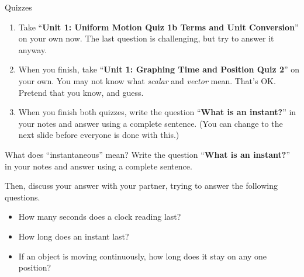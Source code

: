 \documentclass[t]{beamer}
\begin{document}
\begin{frame}{Quizzes}\Large
\begin{enumerate}
\item Take ``\textbf{Unit 1: Uniform Motion Quiz 1b Terms and Unit Conversion}'' on your own now.  The last question is challenging, but try to answer it anyway.
\item When you finish, take ``\textbf{Unit 1: Graphing Time and Position Quiz 2}'' on your own.  You may not know what \emph{scalar} and \emph{vector} mean.  That's OK.  Pretend that you know, and guess.
\item When you finish both quizzes, write the question ``\textbf{What is an instant?}'' in your notes and answer using a complete sentence.  (You can change to the next slide before everyone is done with this.)
\end{enumerate}
\end{frame}

\begin{frame}{What does ``instantaneous'' mean?}\LARGE
Write the question ``\textbf{What is an instant?}'' in your notes and answer using a complete sentence.

Then, discuss your answer with your partner, trying to answer the following questions.
	\begin{itemize}
		\item How many seconds does a clock reading last?
		\item How long does an instant last?
		\item If an object is moving continuously, how long does it stay on any one position?
	\end{itemize}
\end{frame}
\end{document}
